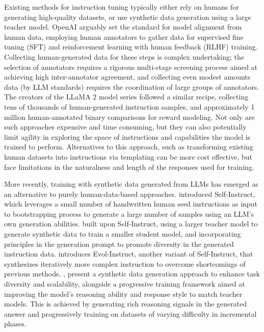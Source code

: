 Existing methods for instruction tuning typically either rely on humans for generating high-quality datasets, or use synthetic data generation using a large teacher model.  
OpenAI \citep{ouyang2022training} arguably set the standard for model alignment from human data, employing human annotators to gather data for supervised fine tuning (SFT) and reinforcement learning with human feedback (RLHF) training. Collecting human-generated data for these steps is complex undertaking; the selection of annotators requires a rigorous multi-stage screening process aimed at achieving high inter-annotator agreement, and collecting even modest amounts data (by LLM standards) requires the coordination of large groups of annotators.
The creators of the LLaMA 2 model series \citep{touvron2023llama}  followed a similar recipe, collecting tens of thousands of human-generated instruction samples, and approximately 1 million human-annotated binary comparisons for reward modeling. 
Not only are such approaches expensive and time consuming, but they can also potentially limit agility in exploring the space of instructions and capabilities the model is trained to perform.
Alternatives to this approach, such as transforming existing human datasets into instructions via templating \citep{weifinetuned} can be more cost effective, but face limitations in the naturalness and length of the responses used for training.

More recently, training with synthetic data generated from LLMs has emerged as an alternative to purely human-data-based approaches.
\cite{wang2023selfinstructaligning} introduced Self-Instruct, which leverages a small number of handwritten human seed instructions as input to bootstrapping process to generate a large number of samples using an LLM's own generation abilities.
\cite{alpaca} built upon Self-Instruct, using a larger teacher model to generate synthetic data to train a smaller student model, and incorporating principles in the generation prompt to promote diversity in the generated instruction data.
\cite{xu2023wizardlmempowering} introduces Evol-Instruct, another variant of Self-Instruct, that synthesizes iteratively more complex instruction to overcome shortcomings of previous methods. 
\cite{mukherjee2023orca}, \cite{mitra2023orcateaching} present a synthetic data generation approach to enhance task diversity and scalability, alongside a progressive training framework aimed at improving the model's reasoning ability and response style to match teacher models. This is achieved by generating rich reasoning signals in the generated answer and progressively training on datasets of varying difficulty in incremental phases. 

